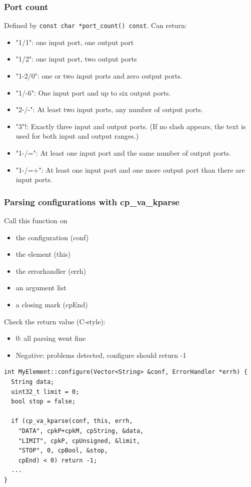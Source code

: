 \documentclass{beamer}
\begin{document}
\begin{frame}[fragile]
\frametitle{Port count}
Defined by \lstinline!const char *port_count() const!. Can return:
\begin{itemize}
	\item "1/1": one input port, one output port
	\item "1/2": one input port, two output ports
	\item "1-2/0": one or two input ports and zero output ports. 
	\item "1/-6": One input port and up to six output ports. 
	\item "2-/-": At least two input ports, any number of output ports. 
	\item "3"!: Exactly three input and output ports. (If no slash appears, the text is used for both input and output ranges.) 
	\item "1-/=": At least one input port and the same number of output ports. 
	\item "1-/=+": At least one input port and one more output port than there are input ports.
\end{itemize}
\end{frame}


\begin{frame}
\frametitle{Parsing configurations with cp\_va\_kparse}
Call this function on
\begin{itemize}
	\item the configuration (conf)
	\item the element (this) 
	\item the errorhandler (errh)
	\item an argument list
	\item a closing mark (cpEnd)
\end{itemize}
Check the return value (C-style):
\begin{itemize}
	\item 0: all parsing went fine
	\item Negative: problems detected, configure should return -1
\end{itemize}

\begin{lstlisting}[basicstyle=\footnotesize]
int MyElement::configure(Vector<String> &conf, ErrorHandler *errh) {
  String data;
  uint32_t limit = 0;
  bool stop = false;
  
  if (cp_va_kparse(conf, this, errh, 
    "DATA", cpkP+cpkM, cpString, &data, 
    "LIMIT", cpkP, cpUnsigned, &limit, 
    "STOP", 0, cpBool, &stop, 
    cpEnd) < 0) return -1;
  ...
}
\end{lstlisting}
\end{frame}
\end{document}
